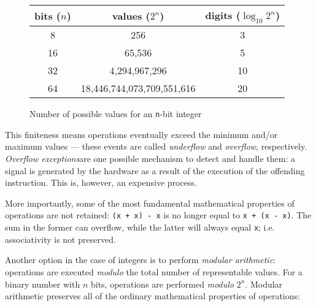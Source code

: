 \begin{figure}[ht]
    \centering
    \begin{tabular}{ccc}
        bits ($n$) & values ($2^n$) & digits ($\log_{10} 2^n$) \\
        \hline
         8 & 256 & 3 \\
        16 & 65,536 & 5 \\
        32 & 4,294,967,296 & 10 \\
        64 & 18,446,744,073,709,551,616 & 20 \\
    \end{tabular}
    \caption{Number of possible values for an \texttt{n}-bit integer}
    \label{tbl:arch:integers:bits}
\end{figure}

This finiteness means operations eventually exceed the minimum and/or maximum
values --- these events are called \textit{underflow} and \textit{overflow},
respectively.  \textit{Overflow exceptions}\footnotemark are one possible
mechanism to detect and handle them: a signal is generated by the hardware as a
result of the execution of the offending instruction.  This is, however, an
expensive process.


More importantly, some of the most fundamental mathematical properties of
operations are not retained: \texttt{(x + x) - x} is no longer equal to
\texttt{x + (x - x)}.  The sum in the former can overflow, while the latter will
always equal \texttt{x}; i.e. associativity is not preserved\footnotemark.


Another option in the case of integers is to perform \textit{modular
arithmetic}: operations are executed \emph{modulo} the total number of
representable values.  For a binary number with $n$ bits, operations are
performed \emph{modulo} $2^n$.  Modular arithmetic preserves all of the ordinary
mathematical properties of operations:

